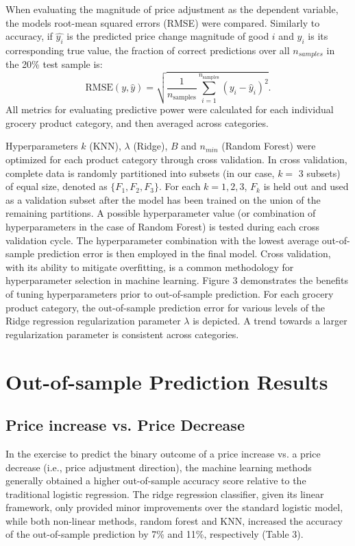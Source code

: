 \documentclass[11pt]{article}
\begin{document}
When evaluating the magnitude of price adjustment as the dependent variable, the models root-mean squared errors (RMSE) were compared. Similarly to accuracy, if $\hat{y_{i}}$ is the predicted price change magnitude of good $i$ and $y_{i}$ is its corresponding true value, the fraction of correct predictions over all $n_{samples}$ in the 20\% test sample is:
%
\begin{equation*}
\text{RMSE}(y, \hat{y}) = \sqrt{ \frac{1}{n_\text{samples}} \sum_{i=1}^{n_\text{samples} } (y_i - \hat{y}_i)^2}.
\end{equation*}
%
All metrics for evaluating predictive power were calculated for each individual grocery product category, and then averaged across categories. 

Hyperparameters $k$ (KNN), $\lambda$ (Ridge), $B$ and $n_{min}$ (Random Forest) were optimized for each product category through cross validation. In cross validation, complete data is randomly partitioned into subsets (in our case, $k = $ 3 subsets) of equal size, denoted as $\{F_{1}, F_{2}, F_{3}\}$. For each $k = 1,2,3$, $F_{k}$ is held out and used as a validation subset after the model has been trained on the union of the remaining partitions. A possible hyperparameter value (or combination of hyperparameters in the case of Random Forest) is tested during each cross validation cycle. The hyperparameter combination with the lowest average out-of-sample prediction error is then employed in the final model. Cross validation, with its ability to mitigate overfitting, is a common methodology for hyperparameter selection in machine learning. Figure 3 demonstrates the benefits of tuning hyperparameters prior to out-of-sample prediction. For each grocery product category, the out-of-sample prediction error for various levels of the Ridge regression regularization parameter $\lambda$ is depicted. A trend towards a larger regularization parameter is consistent across categories. 

\section{Out-of-sample Prediction Results}
\subsection{Price increase vs. Price Decrease}
In the exercise to predict the binary outcome of a price increase vs. a price decrease (i.e., price adjustment direction), the machine learning methods generally obtained a higher out-of-sample accuracy score relative to the traditional logistic regression. The ridge regression classifier, given its linear framework, only provided minor improvements over the standard logistic model, while both non-linear methods, random forest and KNN, increased the accuracy of the out-of-sample prediction by 7\% and 11\%, respectively (Table 3). 
\end{document}
